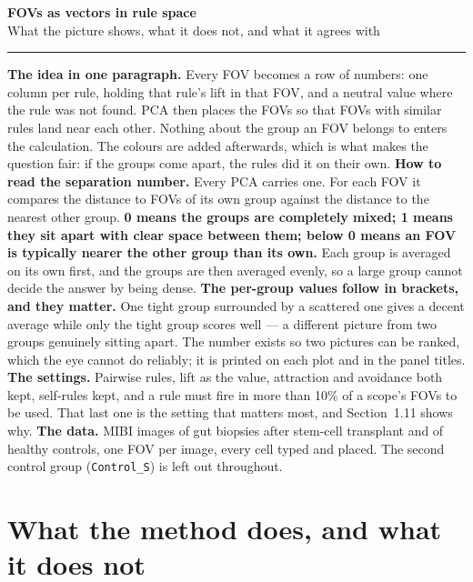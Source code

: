 \documentclass[10pt,a4paper]{article}
\begin{document}
\begin{center}
  {\LARGE\bfseries FOVs as vectors in rule space}\\[0.35em]
  {\large What the picture shows, what it does not, and what it agrees with}
\end{center}
\vspace{0.25cm}
\hrule
\vspace{0.45cm}

\colorbox{soft}{\parbox{0.96\textwidth}{
\textbf{The idea in one paragraph.} Every FOV becomes a row of numbers: one column per
rule, holding that rule's lift in that FOV, and a neutral value where the rule was not
found. PCA then places the FOVs so that FOVs with similar rules land near each other.
Nothing about the group an FOV belongs to enters the calculation. The colours are added
afterwards, which is what makes the question fair: if the groups come apart, the rules
did it on their own.
\hypertarget{sep-guide}{\textbf{How to read the separation number.}} Every PCA carries
one. For each FOV it compares the distance to FOVs of its own group against the distance
to the nearest other group. \textbf{0 means the groups are completely mixed; 1 means they
sit apart with clear space between them; below 0 means an FOV is typically nearer the
other group than its own.} Each group is averaged on its own first, and the groups are
then averaged evenly, so a large group cannot decide the answer by being dense.
\textbf{The per-group values follow in brackets, and they matter.} One tight group
surrounded by a scattered one gives a decent average while only the tight group scores
well --- a different picture from two groups genuinely sitting apart. The number exists so
two pictures can be ranked, which the eye cannot do reliably; it is printed on each plot
and in the panel titles.
\textbf{The settings.} Pairwise rules, lift as the value, attraction and avoidance both
kept, self-rules kept, and a rule must fire in more than 10\% of a scope's FOVs to be
used. That last one is the setting that matters most, and Section~1.11 shows why.
\textbf{The data.} MIBI images of gut biopsies after stem-cell transplant and of healthy
controls, one FOV per image, every cell typed and placed. The second control group
(\texttt{Control\_S}) is left out throughout.
}}

\section{What the method does, and what it does not}
\end{document}
